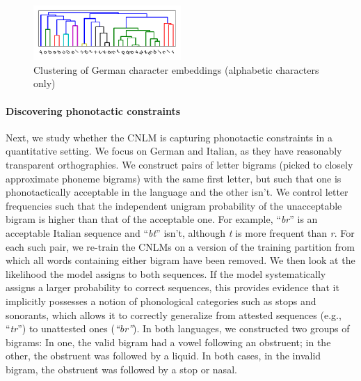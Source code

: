 \begin{figure}
\includegraphics[width=0.50\textwidth]{figures/char-emb-clustering-output_output-phonetic-wiki-german-nospaces-bptt-910515909.pdf}
\caption{Clustering of German character embeddings (alphabetic characters only)}\label{fig:char-clustering}
\end{figure}



\paragraph{Discovering phonotactic constraints}
\label{sec:phonotactics}

Next, we study whether the CNLM is capturing phonotactic constraints
in a quantitative setting.  We focus on German and Italian, as they
have reasonably transparent orthographies.  We construct pairs of
letter bigrams (picked to closely approximate phoneme bigrams) with
the same first letter, but such that one is phonotactically acceptable
in the language and the other isn't. We control letter frequencies
such that the independent unigram probability of the unacceptable
bigram is higher than that of the acceptable one. For example,
``\emph{br}'' is an acceptable Italian sequence and ``\emph{bt}''
isn't, although \emph{t} is more frequent than \emph{r}.  For each
such pair, we re-train the CNLMs on a version of the training partition
from which all words containing either bigram have been removed.  We
then look at the likelihood the model assigns to both sequences. If
the model systematically assigns a larger probability to correct
sequences, this provides evidence that it implicitly possesses a
notion of phonological categories such as stops and sonorants, which
allows it to correctly generalize from attested sequences (e.g.,
``\emph{tr}'') to unattested ones (\emph{``br''}). In both languages,
we constructed two groups of bigrams: In one, the valid bigram had a
vowel following an obstruent; in the other, the obstruent was followed by
a liquid.  In both cases, in the invalid bigram, the obstruent was followed by a
stop or nasal.  %

